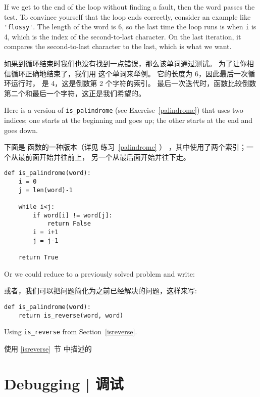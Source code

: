 If we get to the end of the loop without finding a fault, then the
word passes the test.  To convince yourself that the loop ends
correctly, consider an example like \verb"'flossy'".  The
length of the word is 6, so
the last time the loop runs is when {\tt i} is 4, which is the
index of the second-to-last character.  On the last iteration,
it compares the second-to-last character to the last, which is
what we want.

如果到循环结束时我们也没有找到一点错误，那么该单词通过测试。
为了让你相信循环正确地结束了，我们用  这个单词来举例。
它的长度为 6，因此最后一次循环运行时， 是 4，这是倒数第 2 个字符的索引。
最后一次迭代时，函数比较倒数第二个和最后一个字符，这正是我们希望的。

Here is a version of \verb"is_palindrome" (see
Exercise~\ref{palindrome}) that uses two indices; one starts at the
beginning and goes up; the other starts at the end and goes down.

下面是  函数的一种版本（详见 练习~\ref{palindrome} ）
，其中使用了两个索引；一个从最前面开始并往前上， 另一个从最后面开始并往下走。

\begin{lstlisting}
def is_palindrome(word):
    i = 0
    j = len(word)-1

    while i<j:
        if word[i] != word[j]:
            return False
        i = i+1
        j = j-1

    return True
\end{lstlisting}

Or we could reduce to a previously solved
problem and write:

或者，我们可以把问题简化为之前已经解决的问题，这样来写:


\begin{lstlisting}
def is_palindrome(word):
    return is_reverse(word, word)
\end{lstlisting}
%
Using \verb"is_reverse" from Section~\ref{isreverse}.

使用 \ref{isreverse}~节 中描述的 


\section{Debugging  |  调试}
    

